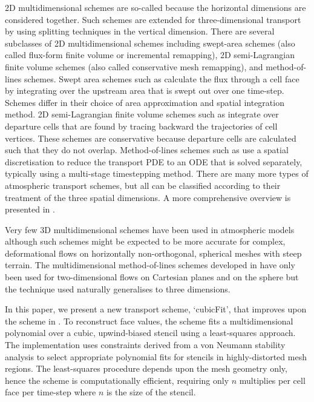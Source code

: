 2D multidimensional schemes are so-called because the horizontal dimensions are considered together.  Such schemes are extended for three-dimensional transport by using splitting techniques in the vertical dimension.
There are several subclasses of 2D multidimensional schemes including swept-area schemes (also called flux-form finite volume or incremental remapping), 2D semi-Lagrangian finite volume schemes (also called conservative mesh remapping), and method-of-lines schemes.
Swept area schemes such as \citep{lashley2002,skamarock-menchaca2010,lauritzen2011,thuburn2014} calculate the flux through a cell face by integrating over the upstream area that is swept out over one time-step.  Schemes differ in their choice of area approximation and spatial integration method.
2D semi-Lagrangian finite volume schemes such as \citep{iske-kaeser2004,lauritzen2010} integrate over departure cells that are found by tracing backward the trajectories of cell vertices.  These schemes are conservative because departure cells are calculated such that they do not overlap.
Method-of-lines schemes such as \citep{weller2009,skamarock-gassmann2011} use a spatial discretisation to reduce the transport PDE to an ODE that is solved separately, typically using a multi-stage timestepping method.
There are many more types of atmospheric transport schemes, but all can be classified according to their treatment of the three spatial dimensions.  A more comprehensive overview is presented in \cite{lauritzen2014}.

Very few 3D multidimensional schemes have been used in atmospheric models \citep[e.g.][]{gassmann2013} although such schemes might be expected to be more accurate for complex, deformational flows on horizontally non-orthogonal, spherical meshes with steep terrain.  The multidimensional method-of-lines schemes developed in \citep{weller2009,weller-shahrokhi2014} have only been used for two-dimensional flows on Cartesian planes and on the sphere but the technique used naturally generalises to three dimensions.

In this paper, we present a new transport scheme, `cubicFit', that improves upon the scheme in \citep{weller-shahrokhi2014}.  To reconstruct face values, the scheme fits a multidimensional polynomial over a cubic, upwind-biased stencil using a least-squares approach.  The implementation uses constraints derived from a von Neumann stability analysis to select appropriate polynomial fits for stencils in highly-distorted mesh regions.  The least-squares procedure depends upon the mesh geometry only, hence the scheme is computationally efficient, requiring only $n$ multiplies per cell face per time-step where $n$ is the size of the stencil.


